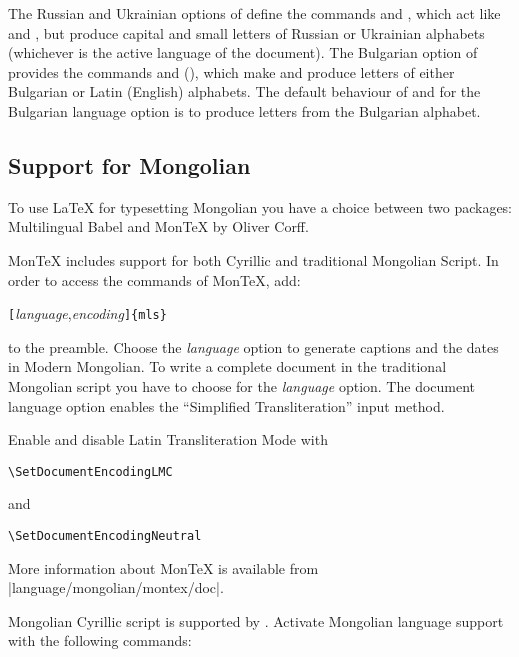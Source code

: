 The Russian and Ukrainian options of  define the commands 
and , which act like  and , but produce capital
and small letters of Russian or Ukrainian alphabets (whichever is the
active language of the document). The Bulgarian option of  
provides the commands  and  (), which
make  and  produce letters of either
Bulgarian or Latin (English) alphabets. The default behaviour of
  and  for the Bulgarian language option is to
produce letters from the Bulgarian alphabet. 


\subsection{Support for Mongolian}

To use \LaTeX{} for typesetting Mongolian you have a choice between two packages:
Multilingual Babel and Mon\TeX{} by Oliver Corff.

Mon\TeX{} includes support for both Cyrillic and traditional
Mongolian Script. In order to access the commands of Mon\TeX{}, add:
\begin{lscommand}
\verb|[|\emph{language},\emph{encoding}\verb|]{mls}|
\end{lscommand}
\noindent to the preamble. Choose the \emph{language} option  to generate
captions and the dates in Modern Mongolian. To write a complete document in the traditional Mongolian script
you have to choose  for the \emph{language} option. The document
language option  enables the ``Simplified Transliteration'' input method.

Enable and disable Latin Transliteration Mode with
\begin{lscommand}
\verb|\SetDocumentEncodingLMC|
\end{lscommand}
and
\begin{lscommand}
\verb|\SetDocumentEncodingNeutral|
\end{lscommand}

More information about Mon\TeX{} is available from
\CTAN|language/mongolian/montex/doc|.

Mongolian Cyrillic script is supported by . Activate
Mongolian language support with the following commands:

